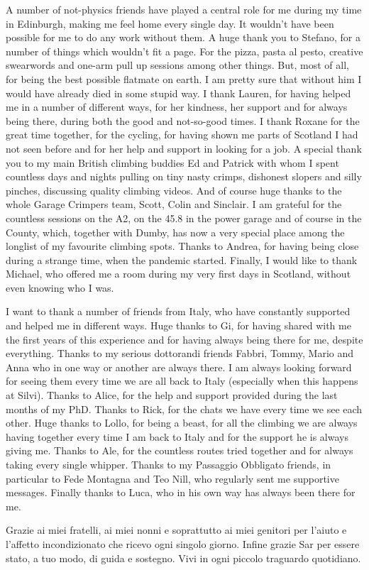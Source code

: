 A number of not-physics friends have played a central role for me during my time in Edinburgh,
making me feel home every single day. It wouldn't have been possible for me to do any work without them.
% 
A huge thank you to Stefano, for a number of things which wouldn't fit a page. For the pizza, pasta al pesto,
creative swearwords and one-arm pull up sessions among other things. 
But, most of all, for being the best possible flatmate on earth.
I am pretty sure that without him I would have already died in some stupid way. 
%
I thank Lauren, for having helped me in a number of different ways, for her kindness, her support and for always being there,
during both the good and not-so-good times.  
I thank Roxane for the great time together, for the cycling, for having shown me parts of Scotland 
I had not seen before and for her help and support in looking for a job. 
%
A special thank you to my main British climbing buddies Ed and Patrick with whom I spent countless days and nights
pulling on tiny nasty crimps, dishonest slopers and silly pinches, discussing quality climbing videos.
And of course huge thanks to the whole Garage Crimpers team,
Scott, Colin and Sinclair. I am grateful for the countless sessions on the A2, on the 45.8 in the power garage 
and of course in the County, which, together with Dumby, has now a very special place among the longlist of my
favourite climbing spots. 
%
Thanks to Andrea, for having being close during a strange time, when the pandemic started.
Finally, I would like to thank Michael, who offered me a room during my very first days in Scotland, without even knowing 
who I was.

%   
I want to thank a number of friends from Italy, who have constantly supported and helped me in different ways.
Huge thanks to Gi, for having shared with me the first years of this experience and for having always being there for me,
despite everything.
Thanks to my serious dottorandi friends Fabbri, Tommy, Mario and Anna who in one way or another are always there.
I am always looking forward for seeing them every time we are all back to Italy (especially when this happens at Silvi).
Thanks to Alice, for the help and support provided during the last months of my PhD. 
Thanks to Rick, for the chats we have every time we see each other.
Huge thanks to Lollo, for being a beast, for all the climbing we are always having together every time
I am back to Italy and for the support he is always giving me.
Thanks to Ale, for the countless routes tried together and for always taking every single whipper.
Thanks to my Passaggio Obbligato friends, in particular to Fede Montagna and Teo Nill, who 
regularly sent me supportive messages. 
Finally thanks to Luca, who in his own way has always been there for me.

Grazie ai miei fratelli, ai miei nonni e soprattutto ai miei genitori per l'aiuto e l'affetto incondizionato
che ricevo ogni singolo giorno. 
Infine grazie Sar per essere stato, a tuo modo, di guida e sostegno. Vivi in ogni piccolo traguardo quotidiano.

\blankpage
 



